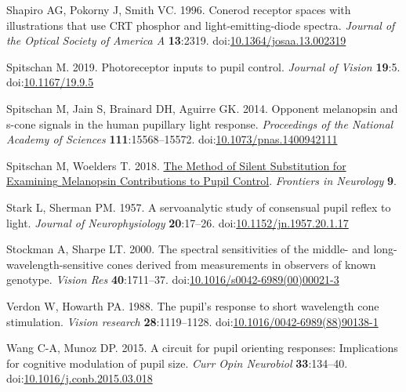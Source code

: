 \documentclass[
]{article}
\newlength{\cslhangindent}
\newlength{\cslentryspacingunit} %
\newenvironment{CSLReferences}[2] %
 {%
  \setlength{\parindent}{0pt}
  \ifodd #1
  \let\oldpar\par
  \def\par{\hangindent=\cslhangindent\oldpar}
  \fi
  \setlength{\parskip}{#2\cslentryspacingunit}
 }%
 {}
\begin{document}
\begin{CSLReferences}{1}{0}
\leavevmode{}%
Shapiro AG, Pokorny J, Smith VC. 1996. Cone{\textendash}rod receptor spaces with illustrations that use {CRT} phosphor and light-emitting-diode spectra. \emph{Journal of the Optical Society of America A} \textbf{13}:2319. doi:\href{https://doi.org/10.1364/josaa.13.002319}{10.1364/josaa.13.002319}

\leavevmode{}%
Spitschan M. 2019. Photoreceptor inputs to pupil control. \emph{Journal of Vision} \textbf{19}:5. doi:\href{https://doi.org/10.1167/19.9.5}{10.1167/19.9.5}

\leavevmode{}%
Spitschan M, Jain S, Brainard DH, Aguirre GK. 2014. Opponent melanopsin and s-cone signals in the human pupillary light response. \emph{Proceedings of the National Academy of Sciences} \textbf{111}:15568--15572. doi:\href{https://doi.org/10.1073/pnas.1400942111}{10.1073/pnas.1400942111}

\leavevmode{}%
Spitschan M, Woelders T. 2018. \href{https://www.frontiersin.org/articles/10.3389/fneur.2018.00941}{The {Method} of {Silent} {Substitution} for {Examining} {Melanopsin} {Contributions} to {Pupil} {Control}}. \emph{Frontiers in Neurology} \textbf{9}.

\leavevmode{}%
Stark L, Sherman PM. 1957. A servoanalytic study of consensual pupil reflex to light. \emph{Journal of Neurophysiology} \textbf{20}:17--26. doi:\href{https://doi.org/10.1152/jn.1957.20.1.17}{10.1152/jn.1957.20.1.17}

\leavevmode{}%
Stockman A, Sharpe LT. 2000. The spectral sensitivities of the middle- and long-wavelength-sensitive cones derived from measurements in observers of known genotype. \emph{Vision Res} \textbf{40}:1711--37. doi:\href{https://doi.org/10.1016/s0042-6989(00)00021-3}{10.1016/s0042-6989(00)00021-3}

\leavevmode{}%
Verdon W, Howarth PA. 1988. The pupil's response to short wavelength cone stimulation. \emph{Vision research} \textbf{28}:1119--1128. doi:\href{https://doi.org/10.1016/0042-6989(88)90138-1}{10.1016/0042-6989(88)90138-1}

\leavevmode{}%
Wang C-A, Munoz DP. 2015. A circuit for pupil orienting responses: Implications for cognitive modulation of pupil size. \emph{Curr Opin Neurobiol} \textbf{33}:134--40. doi:\href{https://doi.org/10.1016/j.conb.2015.03.018}{10.1016/j.conb.2015.03.018}


\end{CSLReferences}
\end{document}
